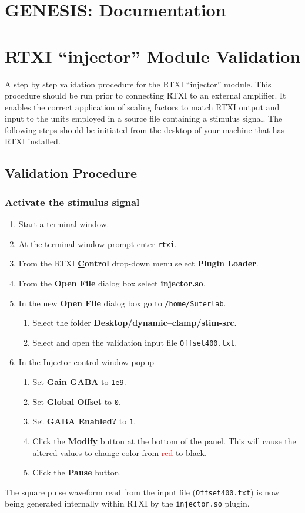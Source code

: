 \documentclass[12pt]{article}
\begin{document}
\section*{GENESIS: Documentation}

\section*{RTXI ``injector'' Module Validation}
A step by step validation procedure for the RTXI ``injector'' module. This procedure should be run prior to connecting RTXI to an external amplifier. It enables the correct application of scaling factors to match RTXI output and input to the units employed in a source file containing a stimulus signal. The following steps should be initiated from the desktop of your machine that has RTXI installed. 

\subsection*{Validation Procedure}

\subsubsection*{Activate the stimulus signal}

\begin{enumerate}
	\item Start a terminal window.
	\item At the terminal window prompt enter {\tt rtxi}.
	\item From the RTXI {\bf \underline Control} drop-down menu select {\bf Plugin Loader}.
	\item From the {\bf Open File} dialog box select {\bf injector.so}.
	\item In the new {\bf Open File} dialog box go to {\tt /home/Suterlab}.

	\begin{enumerate}
		\item Select the folder {\bf Desktop/dynamic--clamp/stim-src}.
		\item Select and open the validation input file {\tt Offset400.txt}.
	\end{enumerate}

	\item In the Injector control window popup
	\begin{enumerate}
		\item Set {\bf Gain GABA} to {\tt 1e9}.
		\item Set {\bf Global Offset} to {\tt 0}.
		\item Set {\bf GABA Enabled?} to {\tt 1}.
		\item Click the {\bf Modify} button at the bottom of the panel. This will cause the altered values 
			to change color from \textcolor{red}{red} to black.
		\item Click the {\bf Pause} button.
	\end{enumerate}
\end{enumerate}
The square pulse waveform read from the input file ({\tt Offset400.txt}) is now being generated internally within RTXI by the {\tt injector.so} plugin.
\end{document}
